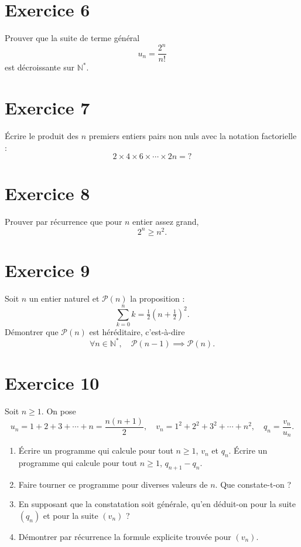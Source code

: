 \documentclass[12pt,a4paper]{article}
\begin{document}
\section*{Exercice 6}
Prouver que la suite de terme général
\[
u_n = \frac{2^n}{n!}
\]
est décroissante sur $\mathbb{N}^*$.


\section*{Exercice 7}
Écrire le produit des $n$ premiers entiers pairs non nuls avec la notation factorielle :
\[
2 \times 4 \times 6 \times \cdots \times 2n = ?
\]

\section*{Exercice 8}
Prouver par récurrence que pour $n$ entier assez grand,
\[
2^n \geq n^2.
\]

\section*{Exercice 9}
Soit $n$ un entier naturel et $\mathcal{P}(n)$ la proposition :
\[
\sum_{k=0}^n k = \tfrac{1}{2}\left(n+\tfrac{1}{2}\right)^2.
\]
Démontrer que $\mathcal{P}(n)$ est héréditaire, c’est-à-dire
\[
\forall n \in \mathbb{N}^*, \quad \mathcal{P}(n-1) \implies \mathcal{P}(n).
\]

\section*{Exercice 10}
Soit $n \geq 1$. On pose
\[
u_n = 1+2+3+\cdots+n = \frac{n(n+1)}{2}, \quad
v_n = 1^2+2^2+3^2+\cdots+n^2, \quad
q_n = \frac{v_n}{u_n}.
\]
\begin{enumerate}
\item Écrire un programme qui calcule pour tout $n \geq 1$, $v_n$ et $q_n$.  
Écrire un programme qui calcule pour tout $n \geq 1$, $q_{n+1}-q_n$.
\item Faire tourner ce programme pour diverses valeurs de $n$. Que constate-t-on ?
\item En supposant que la constatation soit générale, qu’en déduit-on pour la suite $(q_n)$ et pour la suite $(v_n)$ ?
\item Démontrer par récurrence la formule explicite trouvée pour $(v_n)$.
\end{enumerate}
\end{document}
